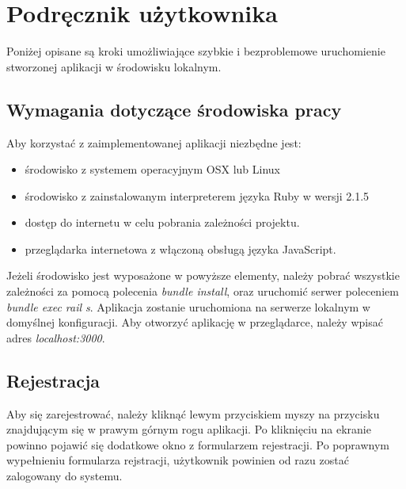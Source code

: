 \chapter{Podręcznik użytkownika}
\label{cha:podrecznik uzytkownika}

Poniżej opisane są kroki umożliwiające szybkie i bezproblemowe uruchomienie stworzonej aplikacji w środowisku lokalnym. 


\section{Wymagania dotyczące środowiska pracy}
Aby korzystać z zaimplementowanej aplikacji niezbędne jest:
\begin{itemize}
\item środowisko z systemem operacyjnym OSX lub Linux
\item środowisko z zainstalowanym interpreterem języka Ruby w wersji 2.1.5
\item dostęp do internetu w celu pobrania zależności projektu.
\item przeglądarka internetowa z włączoną obsługą języka JavaScript.
\end{itemize}
Jeżeli środowisko jest wyposażone w powyższe elementy, należy pobrać wszystkie zależności za pomocą polecenia \textit{bundle install}, oraz uruchomić serwer poleceniem \textit{bundle exec rail s}. Aplikacja zostanie uruchomiona na serwerze lokalnym w domyślnej konfiguracji. Aby otworzyć aplikację w przeglądarce, należy wpisać adres \textit{localhost:3000}.


\newpage

\section{Rejestracja}
\label{sec:rejestracja}
Aby się zarejestrować, należy kliknąć lewym przyciskiem myszy na przycisku  znajdującym się w prawym górnym rogu aplikacji. Po kliknięciu na ekranie powinno pojawić się dodatkowe okno z formularzem rejestracji. Po poprawnym wypełnieniu formularza rejstracji, użytkownik powinien od razu zostać zalogowany do systemu.\\
\\
\begin{minipage}{\linewidth}
\label{registration}
\end{minipage}\\

